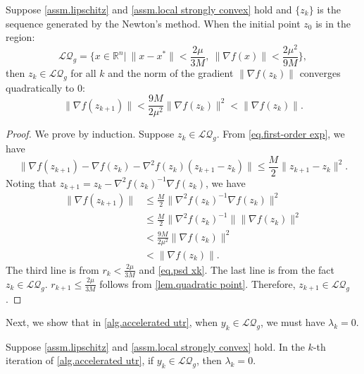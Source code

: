 \documentclass{article}
\begin{document}
\begin{lemma}
    \label{lem.quadratic gradient}
    Suppose \autoref{assm.lipschitz} and \autoref{assm.local strongly convex} hold and $\{z_k\}$ is the sequence generated by the Newton's method. When the initial point $z_0$ is in the region:
    \begin{equation}
        \label{eq.local quadratic region gradient}
        \mathcal{LQ}_g = \{x\in\mathbb{R}^n| \ \|x-x^*\| < \frac{2\mu}{3M}, \ \|\nabla f(x)\|< \frac{2\mu^2}{9M}\}, 
    \end{equation}
    then $z_k \in \mathcal{LQ}_g$ for all $k$ and the norm of the gradient $\|\nabla f(z_k)\|$ converges quadratically to $0$:
    \begin{equation}
        \label{eq.quadratic convergence gradient}
        \|\nabla f(z_{k+1})\| < \frac{9M}{2\mu^2}\|\nabla f(z_k)\|^2<\|\nabla f(z_k)\|.
    \end{equation}
\end{lemma}
\begin{proof}
    We prove by induction. Suppose $z_k\in \mathcal{LQ}_g$. From \eqref{eq.first-order exp}, we have
    \begin{equation*}
            \|\nabla f(z_{k+1}) -\nabla f(z_k)-\nabla^2 f(z_k)(z_{k+1}-z_k)\| \leq \frac{M}{2}\|z_{k+1}-z_k\|^2.
    \end{equation*}
    Noting that $z_{k+1} = z_k-\nabla^2 f(z_k)^{-1}\nabla f(z_k)$, we have
    \begin{equation*}
        \begin{aligned}
            \|\nabla f(z_{k+1})\| &\leq \frac{M}{2}\|\nabla^2 f(z_k)^{-1} \nabla f(z_k)\|^2\\
            & \leq \frac{M}{2}\|\nabla^2 f(z_k)^{-1}\|\| \nabla f(z_k)\|^2\\
            &< \frac{9M}{2\mu^2}\|\nabla f(z_k)\|^2\\
            &< \|\nabla f(z_k)\|.
        \end{aligned}
    \end{equation*}
    The third line is from $r_k< \frac{2\mu}{3M}$ and \eqref{eq.psd xk}. The last line is from the fact $z_k\in \mathcal{LQ}_g$. $r_{k+1} \leq \frac{2\mu}{3M}$ follows from \autoref{lem.quadratic point}. Therefore, $z_{k+1}\in \mathcal{LQ}_g$.
\end{proof}
Next, we show that in \autoref{alg.accelerated utr}, when $y_k\in\mathcal{LQ}_g$, we must have $\lambda_k=0$.
\begin{lemma}
    \label{lem.detection of local quadratic}
    Suppose \autoref{assm.lipschitz} and \autoref{assm.local strongly convex} hold. In the $k$-th iteration of \autoref{alg.accelerated utr}, if $y_k\in\mathcal{LQ}_g$, then $\lambda_k=0$.
\end{lemma}
\end{document}
